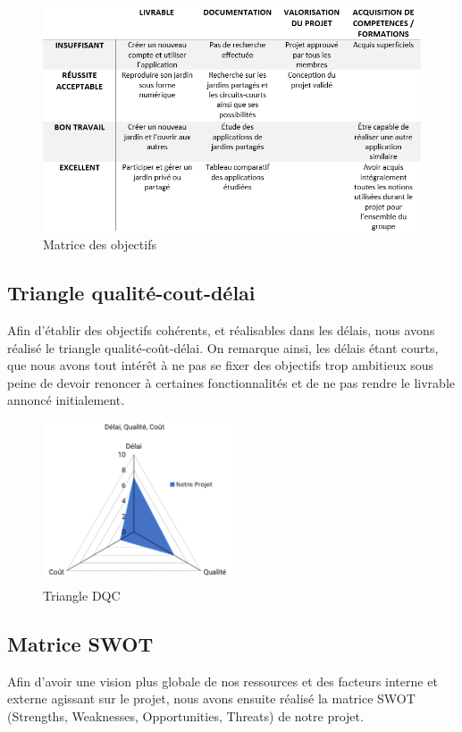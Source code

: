 \documentclass[french,a4paper]{article}
\begin{document}
\begin{figure}[H]
    \centering
    \includegraphics[width=1\textwidth]{img/matrice_des_objectifs.png}
    \caption{Matrice des objectifs}
\end{figure}

\subsection{Triangle qualité-cout-délai}
Afin d’établir des objectifs cohérents, et réalisables dans les délais, nous avons réalisé le triangle qualité-coût-délai. On remarque ainsi, les délais étant courts, que nous avons tout intérêt à ne pas se fixer des objectifs trop ambitieux sous peine de devoir renoncer à certaines fonctionnalités et de ne pas rendre le livrable annoncé initialement.

\begin{figure}[H]
    \centering
    \includegraphics[width=0.5\textwidth]{img/triangle_QCD.png}
    \caption{Triangle DQC}
\end{figure}

\subsection{Matrice SWOT}
Afin d’avoir une vision plus globale de nos ressources et des facteurs interne et externe agissant sur le projet, nous avons ensuite réalisé la matrice SWOT (Strengths, Weaknesses, Opportunities, Threats) de notre projet.
\end{document}
